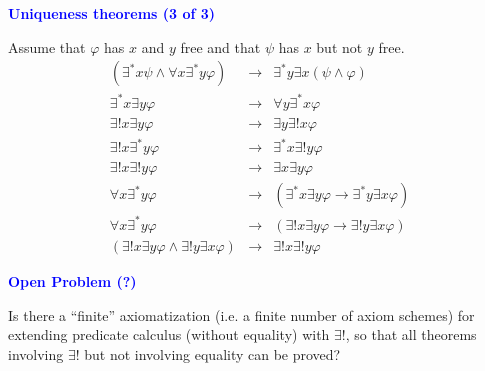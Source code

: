 \documentclass{slides}
\begin{document}
\begin{slide}

\begin{center}
\textcolor{blue}{\textbf{Uniqueness theorems (3 of 3)}}
\end{center}

Assume that $\varphi$ has $x$ and $y$ free and
that $\psi$ has $x$ but not $y$ free.
\begin{eqnarray}
( \exists^\ast x \psi \wedge \forall x \exists^\ast y \varphi )
& \rightarrow &
 \exists^\ast y \exists x ( \psi \wedge \varphi ) \label{moexexv} \\ %
   \exists^\ast x \exists y \varphi & \rightarrow & \forall y \exists^\ast x
\varphi \label{2moex} \\ %
    \exists{!} x \exists y \varphi & \rightarrow & \exists y \exists{!} x
\varphi \label{2euex} \\ %
    \exists{!} x \exists^\ast y \varphi & \rightarrow & \exists^\ast x
\exists{!} y \varphi \label{2eumo} \\ %
     \exists{!} x \exists{!} y \varphi & \rightarrow & \exists x \exists y
\varphi \label{2eu2ex} \\ %
    \forall x \exists^\ast y \varphi & \rightarrow & ( \exists^\ast x \exists
y \varphi \rightarrow \exists^\ast y \exists x \varphi ) \label{2moswap} \\ %
    \forall x \exists^\ast y \varphi & \rightarrow & ( \exists{!} x \exists y
\varphi \rightarrow \exists{!} y \exists x \varphi ) \label{2euswap} \\ %
    ( \exists{!} x \exists y \varphi \wedge \exists{!} y \exists x \varphi
) & \rightarrow & \exists{!} x \exists{!} y \varphi \label{2exeu}  %
\end{eqnarray}


\end{slide}

\begin{slide}

\begin{center}
\textcolor{blue}{\textbf{Open Problem (?)}}
\end{center}

Is there a ``finite'' axiomatization (i.e. a finite number of axiom
schemes) for extending predicate calculus (without
equality) with $\exists{!}$, so that all theorems involving $\exists{!}$
but not involving equality can be proved?



\end{slide}
\end{document}
